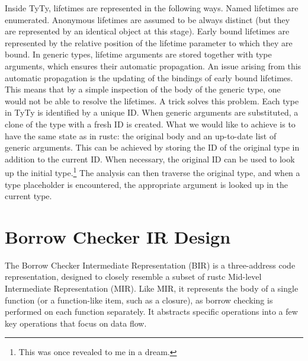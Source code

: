 \documentclass[
  11pt,
  twoside]{report}
\begin{document}
Inside TyTy, lifetimes are represented in the following ways. Named
lifetimes are enumerated. Anonymous lifetimes are assumed to be always
distinct (but they are represented by an identical object at this
stage). Early bound lifetimes are represented by the relative position
of the lifetime parameter to which they are bound. In generic types,
lifetime arguments are stored together with type arguments, which
ensures their automatic propagation. An issue arising from this
automatic propagation is the updating of the bindings of early bound
lifetimes. This means that by a simple inspection of the body of the
generic type, one would not be able to resolve the lifetimes. A trick
solves this problem. Each type in TyTy is identified by a unique ID.
When generic arguments are substituted, a clone of the type with a fresh
ID is created. What we would like to achieve is to have the same state
as in rustc: the original body and an up-to-date list of generic
arguments. This can be achieved by storing the ID of the original type
in addition to the current ID. When necessary, the original ID can be
used to look up the initial type.\footnote{This was once revealed to me
  in a dream.} The analysis can then traverse the original type, and
when a type placeholder is encountered, the appropriate argument is
looked up in the current type.

\section{Borrow Checker IR Design}\label{sec:borrow-checker-ir-design}

The Borrow Checker Intermediate Representation (BIR) is a three-address
code representation, designed to closely resemble a subset of rustc
Mid-level Intermediate Representation (MIR). Like MIR, it represents the
body of a single function (or a function-like item, such as a closure),
as borrow checking is performed on each function separately. It
abstracts specific operations into a few key operations that focus on
data flow.
\end{document}
